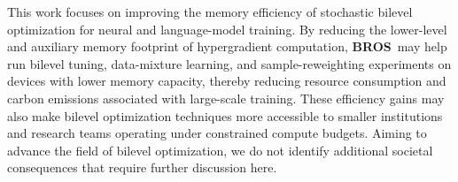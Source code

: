 \documentclass{pkumelon}
\theoremstyle{plain}
\newcommand{\oursname}{\textnormal{\textbf{BROS}}}
\newcommand{\ours}{\oursname\ }
\begin{document}
This work focuses on improving the memory efficiency of stochastic bilevel optimization for neural and language-model training. By reducing the lower-level and auxiliary memory footprint of hypergradient computation, \ours may help run bilevel tuning, data-mixture learning, and sample-reweighting experiments on devices with lower memory capacity, thereby reducing resource consumption and carbon emissions associated with large-scale training. These efficiency gains may also make bilevel optimization techniques more accessible to smaller institutions and research teams operating under constrained compute budgets. Aiming to advance the field of bilevel optimization, we do not identify additional societal consequences that require further discussion here.
\end{document}
